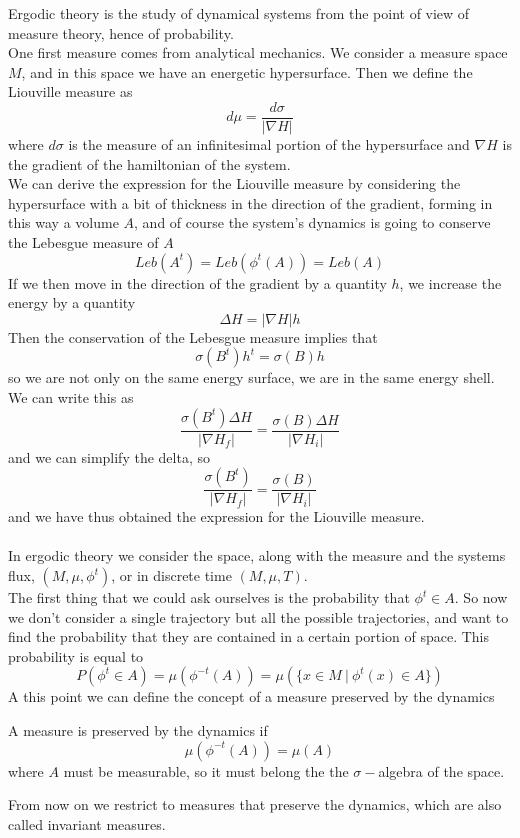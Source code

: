 Ergodic theory is the study of dynamical systems from the point of view of measure theory, hence of probability. \\
One first measure comes from analytical mechanics. We consider a measure space $M$, and in this space we have an energetic hypersurface. Then we define the Liouville measure as
$$
	d\mu = \frac{d\sigma}{|\nabla H|}
$$
where $d\sigma$ is the measure of an infinitesimal portion of the hypersurface and $\nabla H$ is the gradient of the hamiltonian of the system. \\
We can derive the expression for the Liouville measure by considering the hypersurface with a bit of thickness in the direction of the gradient, forming in this way a volume $A$, and of course the system's dynamics is going to conserve the Lebesgue measure of $A$
$$
	Leb(A^t) = Leb(\phi^t(A)) = Leb(A)
$$
If we then move in the direction of the gradient by a quantity $h$, we increase the energy by a quantity
$$
	\Delta H = |\nabla H|h
$$
Then the conservation of the Lebesgue measure implies that
$$
	\sigma(B^t)h^t = \sigma(B)h
$$
so we are not only on the same energy surface, we are in the same energy shell. We can write this as
$$
	\frac{\sigma(B^t)\Delta H}{|\nabla H_f|} = \frac{\sigma(B)\Delta H}{|\nabla H_i|}
$$
and we can simplify the delta, so
$$
	\frac{\sigma(B^t)}{|\nabla H_f|} = \frac{\sigma(B)}{|\nabla H_i|}
$$
and we have thus obtained the expression for the Liouville measure. \\ \\ 
In ergodic theory we consider the space, along with the measure and the systems flux, $(M,\mu,\phi^t)$, or in discrete time $(M,\mu,T)$. \\
The first thing that we could ask ourselves is the probability that $\phi^t \in A$. So now we don't consider a single trajectory but all the possible trajectories, and want to find the probability that they are contained in a certain portion of space. This probability is equal to 
$$
	P(\phi^t \in A) = \mu(\phi^{-t}(A)) = \mu(\{x\in M \ | \ \phi^t(x) \in A\})
$$
A this point we can define the concept of a measure preserved by the dynamics
\begin{definition}
	A measure is preserved by the dynamics if 
	$$
		\mu(\phi^{-t}(A)) = \mu(A)
	$$
	where $A$ must be measurable, so it must belong the the $\sigma-$algebra of the space.
\end{definition}
From now on we restrict to measures that preserve the dynamics, which are also called invariant measures. \\ \\
